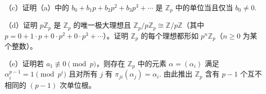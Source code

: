 \begin{enumerate}
（c）证明（a）中的 \(b_0 + b_1p + b_2p^2 + b_3p^3 + \cdots\) 是 \(\mathbb{Z}_p\) 中的单位当且仅当 \(b_0 \neq 0\).

（d）证明 \(p\mathbb{Z}_p\) 是 \(\mathbb{Z}_p\) 的唯一极大理想且 \(\mathbb{Z}_p/p\mathbb{Z}_p \cong \mathbb{Z}/p\mathbb{Z}\)（其中 \(p = 0 + 1\cdot p + 0\cdot p^2 + 0\cdot p^3 + \cdots\)）。证明 \(\mathbb{Z}_p\) 的每个理想都形如 \(p^n\mathbb{Z}_p\)（\(n \geq 0\) 为某个整数）。

（e）证明若 \(a_1 \not\equiv 0 \pmod p\)，则存在 \(\mathbb{Z}_p\) 中的元素 \(\alpha = (\alpha_i)\) 满足 \(\alpha_i^{p-1} = 1 \pmod{p^i}\) 且对所有 \(j\) 有 \(\pi_{ji}(\alpha_j) = \alpha_i\). 由此推出 \(\mathbb{Z}_p\) 含有 \(p-1\) 个互不相同的 \((p-1)\) 次单位根。
\end{enumerate}
